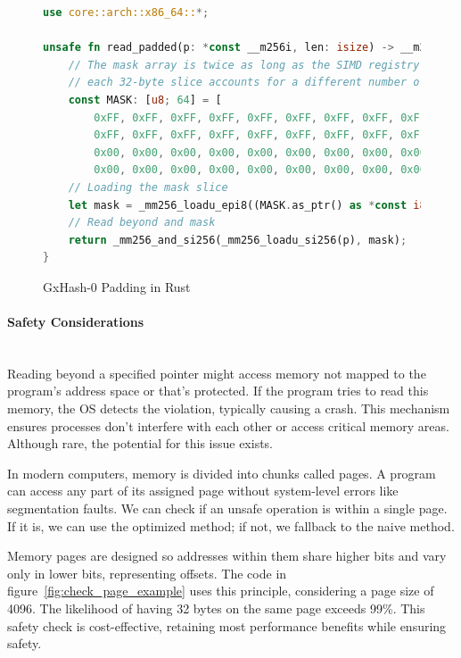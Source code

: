 \documentclass[10pt]{article}
\begin{document}
\begin{figure}[H]
\begin{lstlisting}[language=Rust, style=boxed]
use core::arch::x86_64::*;

unsafe fn read_padded(p: *const __m256i, len: isize) -> __m256i {
    // The mask array is twice as long as the SIMD registry size (32*2 here), so that
    // each 32-byte slice accounts for a different number of trailing bytes to mask out
    const MASK: [u8; 64] = [
        0xFF, 0xFF, 0xFF, 0xFF, 0xFF, 0xFF, 0xFF, 0xFF, 0xFF, 0xFF, 0xFF, 0xFF, 0xFF, 0xFF, 0xFF, 0xFF,
        0xFF, 0xFF, 0xFF, 0xFF, 0xFF, 0xFF, 0xFF, 0xFF, 0xFF, 0xFF, 0xFF, 0xFF, 0xFF, 0xFF, 0xFF, 0xFF,
        0x00, 0x00, 0x00, 0x00, 0x00, 0x00, 0x00, 0x00, 0x00, 0x00, 0x00, 0x00, 0x00, 0x00, 0x00, 0x00,
        0x00, 0x00, 0x00, 0x00, 0x00, 0x00, 0x00, 0x00, 0x00, 0x00, 0x00, 0x00, 0x00, 0x00, 0x00, 0x00 ];
    // Loading the mask slice
    let mask = _mm256_loadu_epi8((MASK.as_ptr() as *const i8).offset(32 - len));
    // Read beyond and mask
    return _mm256_and_si256(_mm256_loadu_si256(p), mask);
}
\end{lstlisting}
\caption{GxHash-0 Padding in Rust}
\label{fig:read_beyond_example}
\end{figure}

\paragraph{Safety Considerations}\leavevmode\\
Reading beyond a specified pointer might access memory not mapped to the program's address space or that's protected. If the program tries to read this memory, the OS detects the violation, typically causing a crash. This mechanism ensures processes don't interfere with each other or access critical memory areas. Although rare, the potential for this issue exists.

In modern computers, memory is divided into chunks called pages. A program can access any part of its assigned page without system-level errors like segmentation faults. We can check if an unsafe operation is within a single page. If it is, we can use the optimized method; if not, we fallback to the naive method.

Memory pages are designed so addresses within them share higher bits and vary only in lower bits, representing offsets. The code in figure~\ref{fig:check_page_example} uses this principle, considering a page size of 4096. The likelihood of having 32 bytes on the same page exceeds 99\%. This safety check is cost-effective, retaining most performance benefits while ensuring safety.
\end{document}
